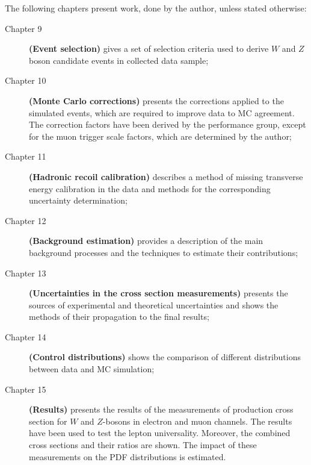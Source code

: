 \newpage

The following chapters present work, done by the author, unless stated otherwise:
\begin{description}
\item [Chapter 9] \textbf{(Event selection)} gives a set of selection criteria used to derive $W$ and $Z$ boson candidate events in collected data sample;
\item [Chapter 10] \textbf{(Monte Carlo corrections)} presents the corrections applied to the simulated events, which are required to improve data to MC agreement. The correction factors have been derived by the \atlas performance group, except for the muon trigger scale factors, which are determined by the author;
\item [Chapter 11] \textbf{(Hadronic recoil calibration)} describes a method of missing transverse energy calibration in the data and methods for the corresponding uncertainty determination;
\item [Chapter 12] \textbf{(Background estimation)} provides a description of the main background processes and the techniques to estimate their contributions;
\item [Chapter 13] \textbf{(Uncertainties in the cross section measurements)} presents the sources of experimental and theoretical uncertainties and shows the methods of their propagation to the final results;
\item [Chapter 14] \textbf{(Control distributions)} shows the comparison of different distributions between data and MC simulation;
\item [Chapter 15] \textbf{(Results)} presents the results of the measurements of production cross section for $W$ and $Z$-bosons in electron and muon channels. The results have been used to test the lepton universality. Moreover, the combined cross sections and their ratios are shown. The impact of these measurements on the PDF distributions is estimated.
\end{description}
